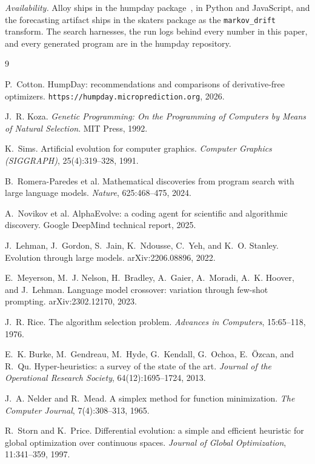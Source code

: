 \documentclass[11pt]{article}
\begin{document}
\vspace{1em}
\noindent\emph{Availability.} Alloy ships in the humpday
package~\cite{humpday}, in Python and JavaScript, and the forecasting
artifact ships in the skaters package as the \texttt{markov\_drift}
transform. The search harnesses, the run logs behind every number in this
paper, and every generated program are in the humpday repository.

\begin{thebibliography}{9}

 P.~Cotton.
HumpDay: recommendations and comparisons of derivative-free optimizers.
\texttt{https://humpday.microprediction.org}, 2026.

 J.~R. Koza.
\emph{Genetic Programming: On the Programming of Computers by Means of
Natural Selection}. MIT Press, 1992.

 K.~Sims.
Artificial evolution for computer graphics.
\emph{Computer Graphics (SIGGRAPH)}, 25(4):319--328, 1991.

 B.~Romera-Paredes et al.
Mathematical discoveries from program search with large language models.
\emph{Nature}, 625:468--475, 2024.

 A.~Novikov et al.
AlphaEvolve: a coding agent for scientific and algorithmic discovery.
Google DeepMind technical report, 2025.

 J.~Lehman, J.~Gordon, S.~Jain, K.~Ndousse, C.~Yeh, and
K.~O. Stanley. Evolution through large models.
arXiv:2206.08896, 2022.

 E.~Meyerson, M.~J. Nelson, H.~Bradley, A.~Gaier,
A.~Moradi, A.~K. Hoover, and J.~Lehman.
Language model crossover: variation through few-shot prompting.
arXiv:2302.12170, 2023.

 J.~R. Rice.
The algorithm selection problem.
\emph{Advances in Computers}, 15:65--118, 1976.

 E.~K. Burke, M.~Gendreau, M.~Hyde, G.~Kendall, G.~Ochoa,
E.~\"Ozcan, and R.~Qu.
Hyper-heuristics: a survey of the state of the art.
\emph{Journal of the Operational Research Society}, 64(12):1695--1724, 2013.

 J.~A. Nelder and R.~Mead.
A simplex method for function minimization.
\emph{The Computer Journal}, 7(4):308--313, 1965.

 R.~Storn and K.~Price.
Differential evolution: a simple and efficient heuristic for global
optimization over continuous spaces.
\emph{Journal of Global Optimization}, 11:341--359, 1997.


\end{thebibliography}
\end{document}

